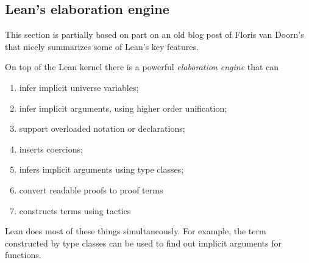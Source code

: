\documentclass[11pt]{amsart}  %
\begin{document}
\ifextver

\subsection{Lean's elaboration engine}
\label{app:elaboration}
This section is partially based on part on an old blog post
of Floris van Doorn's that nicely summarizes some of Lean's key features.
    
On top of the Lean kernel there is a powerful \emph{elaboration engine} that can
\begin{enumerate}
\item infer implicit universe variables;
\item infer implicit arguments, using higher order unification;
\item support overloaded notation or declarations;
\item inserts coercions;
\item infers implicit arguments using type classes;
\item convert readable proofs to proof terms
\item constructs terms using tactics
\end{enumerate}
Lean does most of these things simultaneously. For example, the term constructed by
type classes can be used to find out implicit arguments for functions.
\end{document}
